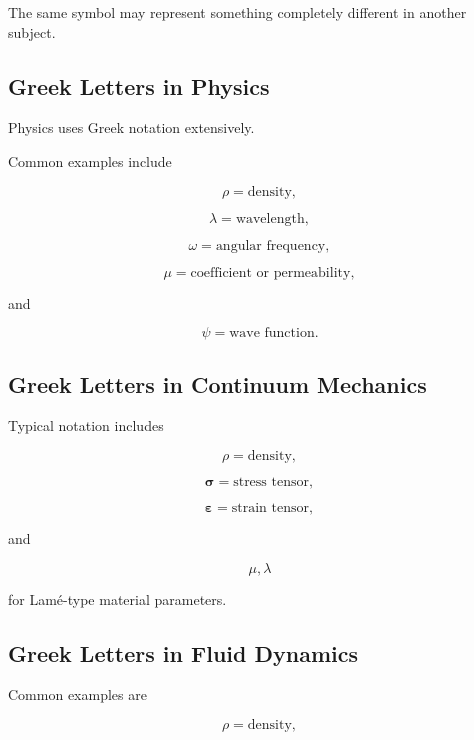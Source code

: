 The same symbol may represent something completely different in another
subject.

\subsection{Greek Letters in Physics}
\label{subsec:greek-physics-uses}

Physics uses Greek notation extensively.

Common examples include

\[
\boxed{
\rho
=
\text{density},
}
\]

\[
\boxed{
\lambda
=
\text{wavelength},
}
\]

\[
\boxed{
\omega
=
\text{angular frequency},
}
\]

\[
\boxed{
\mu
=
\text{coefficient or permeability},
}
\]

and

\[
\boxed{
\psi
=
\text{wave function}.
}
\]

\subsection{Greek Letters in Continuum Mechanics}
\label{subsec:greek-continuum-uses}

Typical notation includes

\[
\boxed{
\rho
=
\text{density},
}
\]

\[
\boxed{
\boldsymbol{\sigma}
=
\text{stress tensor},
}
\]

\[
\boxed{
\boldsymbol{\varepsilon}
=
\text{strain tensor},
}
\]

and

\[
\boxed{
\mu,\lambda
}
\]

for Lam\'e-type material parameters.

\subsection{Greek Letters in Fluid Dynamics}
\label{subsec:greek-fluid-uses}

Common examples are

\[
\boxed{
\rho
=
\text{density},
}
\]

